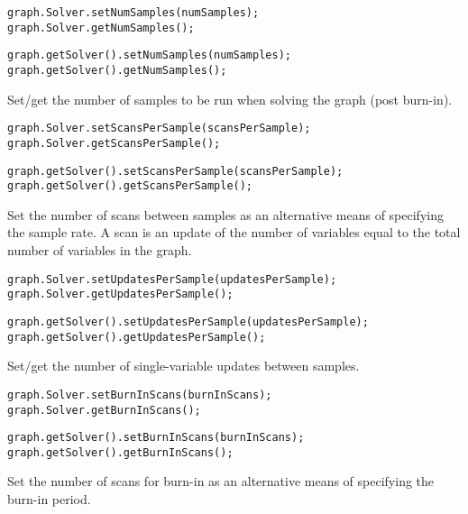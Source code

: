 \ifmatlab
\begin{lstlisting}
graph.Solver.setNumSamples(numSamples);
graph.Solver.getNumSamples();
\end{lstlisting}
\fi

\ifjava
\begin{lstlisting}
graph.getSolver().setNumSamples(numSamples);
graph.getSolver().getNumSamples();
\end{lstlisting}
\fi

Set/get the number of samples to be run when solving the graph (post burn-in).

\ifmatlab
\begin{lstlisting}
graph.Solver.setScansPerSample(scansPerSample);
graph.Solver.getScansPerSample();
\end{lstlisting}
\fi

\ifjava
\begin{lstlisting}
graph.getSolver().setScansPerSample(scansPerSample);
graph.getSolver().getScansPerSample();
\end{lstlisting}
\fi

Set the number of scans between samples as an alternative means of specifying the sample rate. A scan is an update of the number of variables equal to the total number of variables in the graph.

\ifmatlab
\begin{lstlisting}
graph.Solver.setUpdatesPerSample(updatesPerSample);
graph.Solver.getUpdatesPerSample();
\end{lstlisting}
\fi

\ifjava
\begin{lstlisting}
graph.getSolver().setUpdatesPerSample(updatesPerSample);
graph.getSolver().getUpdatesPerSample();
\end{lstlisting}
\fi


Set/get the number of single-variable updates between samples.

\ifmatlab
\begin{lstlisting}
graph.Solver.setBurnInScans(burnInScans);
graph.Solver.getBurnInScans();
\end{lstlisting}
\fi

\ifjava
\begin{lstlisting}
graph.getSolver().setBurnInScans(burnInScans);
graph.getSolver().getBurnInScans();
\end{lstlisting}
\fi

Set the number of scans for burn-in as an alternative means of specifying the burn-in period.

